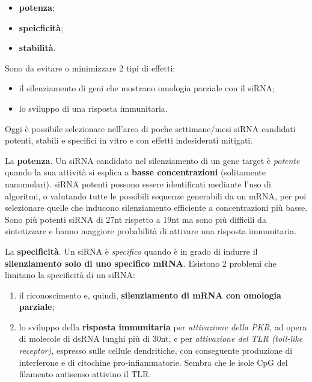 \documentclass[11pt]{book}
\begin{document}
\begin{itemize}
\itemsep1pt\parskip0pt
\item
  \textbf{potenza};
\item
  \textbf{speicficità};
\item
  \textbf{stabilità}.
\end{itemize}

Sono da evitare o minimizzare 2 tipi di effetti:

\begin{itemize}
\itemsep1pt\parskip0pt
\item
  il silenziamento di geni che mostrano omologia parziale con il siRNA;
\item
  lo sviluppo di una risposta immunitaria.
\end{itemize}

Oggi è possibile selezionare nell'arco di poche settimane/mesi siRNA
candidati potenti, stabili e specifici in vitro e con effetti
indesiderati mitigati.

La \textbf{potenza}. Un siRNA candidato nel silenziamento di un gene
target è \emph{potente} quando la sua attività si esplica a
\textbf{basse concentrazioni} (solitamente nanomolari). siRNA potenti
possono essere identificati mediante l'uso di algoritmi, o valutando
tutte le possibili sequenze generabili da un mRNA, per poi selezionare
quelle che inducono silenziamento efficiente a concentrazioni più basse.
Sono più potenti siRNA di 27nt rispetto a 19nt ma sono più difficili da
sintetizzare e hanno maggiore probabilità di attivare una risposta
immunitaria.

La \textbf{specificità}. Un siRNA è \emph{specifico} quando è in grado
di indurre il \textbf{silenziamento solo di uno specifico mRNA}.
Esistono 2 problemi che limitano la specificità di un siRNA:

\begin{enumerate}
\def\labelenumi{\arabic{enumi}.}
\itemsep1pt\parskip0pt
\item
  il riconoscimento e, quindi, \textbf{silenziamento di mRNA con
  omologia parziale};
\item
  lo sviluppo della \textbf{risposta immunitaria} per \emph{attivazione
  della PKR}, ad opera di molecole di dsRNA lunghi più di 30nt, e per
  \emph{attivazione del TLR (toll-like receptor)}, espresso sulle
  cellule dendritiche, con conseguente produzione di interferone e di
  citochine pro-infiammatorie. Sembra che le isole CpG del filamento
  antisenso attivino il TLR.
\end{enumerate}
\end{document}

